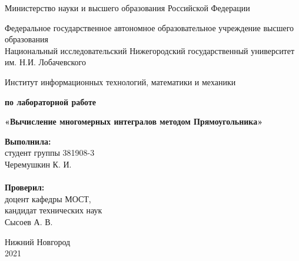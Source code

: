 \documentclass{report}
\begin{document}
\begin{titlepage}

\begin{center}
Министерство науки и высшего образования Российской Федерации
\end{center}

\begin{center}
Федеральное государственное автономное образовательное учреждение высшего образования \\
Национальный исследовательский Нижегородский государственный университет им. Н.И. Лобачевского
\end{center}

\begin{center}
Институт информационных технологий, математики и механики
\end{center}

\vspace{4em}

\begin{center}
\textbf{ по лабораторной работе} \\
\end{center}
\begin{center}
\textbf{\Large«Вычисление многомерных интегралов методом Прямоугольника»} \\
\end{center}

\vspace{4em}

\newbox{\lbox}
\newlength{\maxl}
\setlength{\maxl}{\wd\lbox}
\hfill\parbox{7cm}{
\hspace*{5cm}\hspace*{-5cm}\textbf{Выполнила:} \\ студент группы 381908-3 \\ Черемушкин К. И.\\
\\
\hspace*{5cm}\hspace*{-5cm}\textbf{Проверил:}\\ доцент кафедры МОСТ, \\ кандидат технических наук \\ Сысоев А. В.\\
}
\vspace{\fill}

\begin{center} Нижний Новгород \\ 2021 \end{center}

\end{titlepage}
\end{document}
